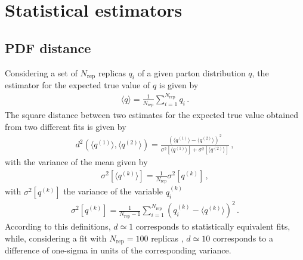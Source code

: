 \chapter{Statistical estimators}
\label{app:estimators}
\section{PDF distance}
Considering a set of $N_{\text{rep}}$ replicas $q_i$ of a given parton distribution $q$, the estimator for 
the expected true value of $q$ is given by
\begin{align}
    \langle q \rangle = \frac{1}{N_{\text{rep}}}\sum_{i=1}^{N_{\text{rep}}}q_i\,.
\end{align}
The square distance between two estimates for the expected true value obtained from two different fits
is given by \cite{Ball:2010de}
\begin{align}
    d^2\left(\langle q^{(1)} \rangle, \langle q^{(2)} \rangle\right) = 
    \frac{\left(\langle q^{(1)} \rangle - \langle q^{(2)} \rangle\right)^2}{\sigma^2\left[\langle q^{(1)} \rangle\right]
    + \sigma^2\left[\langle q^{(2)} \rangle\right]}\,,
\end{align}
with the variance of the mean given by 
\begin{align}
    \sigma^2\left[\langle q^{(k)} \rangle\right] = \frac{1}{N_{\text{rep}}}\sigma^2\left[q^{(k)}\right]\,,
\end{align}
with $\sigma^2\left[q^{(k)}\right]$ the variance of the variable $q^{(k)}_i$
\begin{align}
    \label{eq:}
    \sigma^2\left[q^{(k)}\right] = \frac{1}{N_{\text{rep}}-1}\sum_{i=1}^{N_{\text{rep}}}
    \left(q^{(k)}_i - \langle q^{(k)} \rangle\right)^2\,.
\end{align}
According to this definitions, $ d \simeq 1 $ corresponds to statistically equivalent fits, while, considering 
a fit with $N_{\text{rep}} = 100$ replicas , 
$d \simeq 10 $ corresponds to a difference of one-sigma in units of the corresponding variance.

